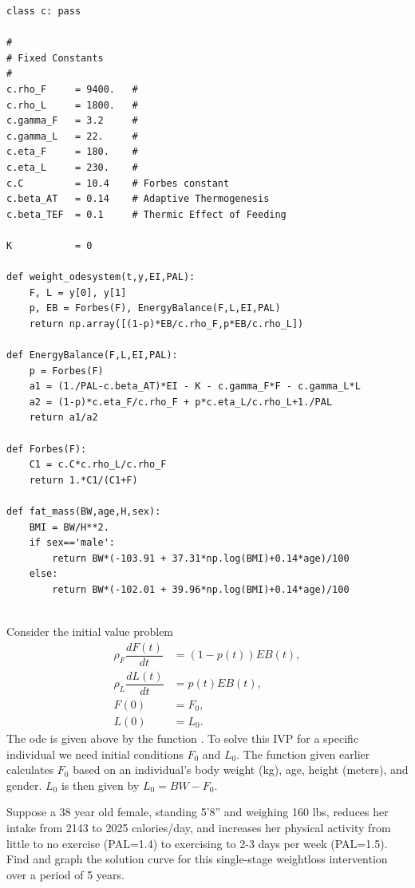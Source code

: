 \begin{lstlisting}
class c: pass

# 
# Fixed Constants
# 
c.rho_F		= 9400.   # 
c.rho_L		= 1800.   #
c.gamma_F	= 3.2     # 
c.gamma_L	= 22.     # 
c.eta_F		= 180.    # 
c.eta_L		= 230.    # 
c.C			= 10.4    # Forbes constant
c.beta_AT	= 0.14    # Adaptive Thermogenesis
c.beta_TEF	= 0.1     # Thermic Effect of Feeding

K 			= 0

def weight_odesystem(t,y,EI,PAL):
	F, L = y[0], y[1]
	p, EB = Forbes(F), EnergyBalance(F,L,EI,PAL)
	return np.array([(1-p)*EB/c.rho_F,p*EB/c.rho_L]) 

def EnergyBalance(F,L,EI,PAL):
	p = Forbes(F)
	a1 = (1./PAL-c.beta_AT)*EI - K - c.gamma_F*F - c.gamma_L*L
	a2 = (1-p)*c.eta_F/c.rho_F + p*c.eta_L/c.rho_L+1./PAL
	return a1/a2

def Forbes(F):
	C1 = c.C*c.rho_L/c.rho_F
	return 1.*C1/(C1+F)

def fat_mass(BW,age,H,sex):
	BMI = BW/H**2.
	if sex=='male': 
		return BW*(-103.91 + 37.31*np.log(BMI)+0.14*age)/100
	else: 
		return BW*(-102.01 + 39.96*np.log(BMI)+0.14*age)/100
	
\end{lstlisting}

\begin{problem}
Consider the initial value problem
\begin{subequations}
\label{weight_prob1}
\begin{align*}
\rho_F \dfrac{dF(t)}{dt} &= (1-p(t)) EB(t),\\ %
\rho_L \dfrac{dL(t)}{dt} &= p(t) EB(t),\\%
F(0) &= F_0, \\
L(0) &= L_0.
\end{align*}
\end{subequations}
The ode is given above by the function . To solve this IVP for
 a specific individual we need initial conditions $F_0$ and $L_0.$ The function
  given earlier calculates $F_0$ based on an individual's 
body weight (kg), age, height (meters), and gender. $L_0$ is then given by 
$L_0 = BW - F_0$.

Suppose a 38 year old female, standing 5'8'' and weighing 160 lbs, reduces her intake from 
2143 to 2025 calories/day, and increases her physical activity from little to no exercise
 (PAL=1.4) to exercising to 2-3 days per week (PAL=1.5).  
Find and graph the solution curve for this single-stage weightloss intervention over a
 period of 5 years.

\end{problem}

